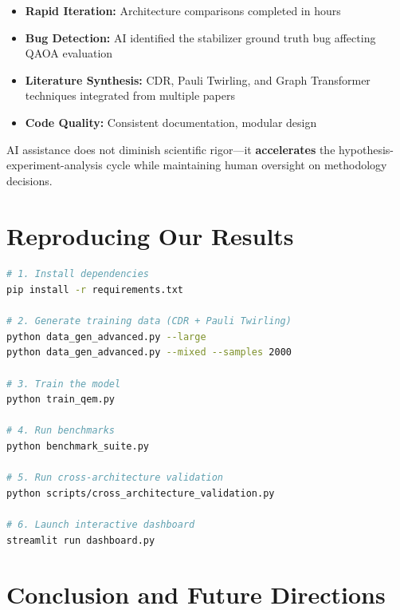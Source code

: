 \documentclass[11pt, a4paper]{article}
\begin{document}
\begin{itemize}
    \item \textbf{Rapid Iteration:} Architecture comparisons completed in hours
    \item \textbf{Bug Detection:} AI identified the stabilizer ground truth bug
    affecting QAOA evaluation
    \item \textbf{Literature Synthesis:} CDR, Pauli Twirling, and Graph
    Transformer techniques integrated from multiple papers
    \item \textbf{Code Quality:} Consistent documentation, modular design
\end{itemize}

\begin{keyinsight}
AI assistance does not diminish scientific rigor---it \textbf{accelerates} the
hypothesis-experiment-analysis cycle while maintaining human oversight on
methodology decisions.
\end{keyinsight}

\section{Reproducing Our Results}
\label{sec:reproduction}

\begin{lstlisting}[language=bash, caption=Reproduction Commands]
# 1. Install dependencies
pip install -r requirements.txt

# 2. Generate training data (CDR + Pauli Twirling)
python data_gen_advanced.py --large
python data_gen_advanced.py --mixed --samples 2000

# 3. Train the model
python train_qem.py

# 4. Run benchmarks
python benchmark_suite.py

# 5. Run cross-architecture validation
python scripts/cross_architecture_validation.py

# 6. Launch interactive dashboard
streamlit run dashboard.py
\end{lstlisting}

\section{Conclusion and Future Directions}
\label{sec:conclusion}
\end{document}
